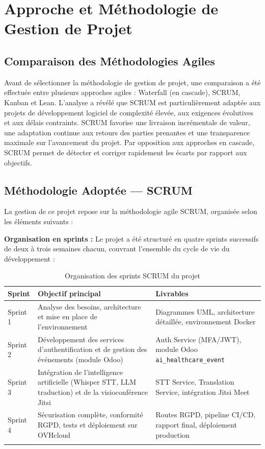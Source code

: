 \section{Approche et Méthodologie de Gestion de Projet}

\subsection{Comparaison des Méthodologies Agiles}
Avant de sélectionner la méthodologie de gestion de projet, une comparaison a été effectuée entre plusieurs approches agiles : Waterfall (en cascade), SCRUM, Kanban et Lean. L'analyse a révélé que SCRUM est particulièrement adaptée aux projets de développement logiciel de complexité élevée, aux exigences évolutives et aux délais contraints. SCRUM favorise une livraison incrémentale de valeur, une adaptation continue aux retours des parties prenantes et une transparence maximale sur l'avancement du projet. Par opposition aux approches en cascade, SCRUM permet de détecter et corriger rapidement les écarts par rapport aux objectifs.

\subsection{Méthodologie Adoptée — SCRUM}
La gestion de ce projet repose sur la méthodologie agile SCRUM, organisée selon les éléments suivants :

\textbf{Organisation en sprints :} Le projet a été structuré en quatre sprints successifs de deux à trois semaines chacun, couvrant l'ensemble du cycle de vie du développement :

\begin{longtable}{|m{2cm}|m{5cm}|m{6cm}|}
\hline
\textbf{Sprint} & \textbf{Objectif principal} & \textbf{Livrables} \\
\hline
\endhead
\endfoot
\endlastfoot
\hline
Sprint 1 & Analyse des besoins, architecture et mise en place de l'environnement & Diagrammes UML, architecture détaillée, environnement Docker \\
\hline
Sprint 2 & Développement des services d'authentification et de gestion des événements (module Odoo) & Auth Service (MFA/JWT), module Odoo \texttt{ai\_healthcare\_event} \\
\hline
Sprint 3 & Intégration de l'intelligence artificielle (Whisper STT, LLM traduction) et de la visioconférence Jitsi & STT Service, Translation Service, intégration Jitsi Meet \\
\hline
Sprint 4 & Sécurisation complète, conformité RGPD, tests et déploiement sur OVHcloud & Routes RGPD, pipeline CI/CD, rapport final, déploiement production \\
\hline
\captionsetup{justification=centering,margin=2cm}
\caption{Organisation des sprints SCRUM du projet}
\label{tab:sprints}
\end{longtable}

